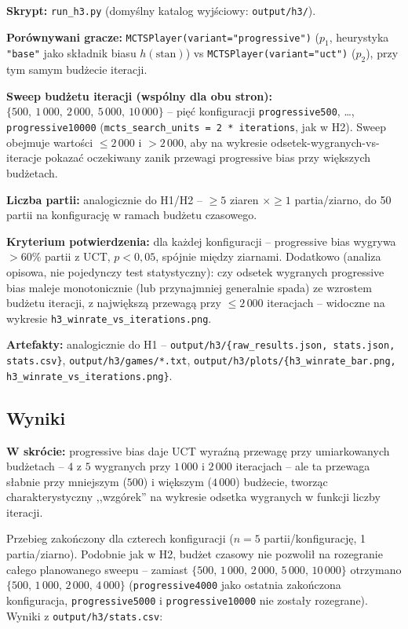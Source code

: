 \documentclass[11pt,a4paper]{article}
\begin{document}
\textbf{Skrypt:} \texttt{run\_h3.py} (domyślny katalog wyjściowy:
\texttt{output/h3/}).

\textbf{Porównywani gracze:} \texttt{MCTSPlayer(variant="progressive")}
($p_1$, heurystyka \texttt{"base"} jako składnik biasu $h(\text{stan})$)
vs \texttt{MCTSPlayer(variant="uct")} ($p_2$), przy tym samym budżecie
iteracji.

\textbf{Sweep budżetu iteracji (wspólny dla obu stron):}
$\{500,\ 1\,000,\ 2\,000,\ 5\,000,\ 10\,000\}$ -- pięć konfiguracji
\texttt{progressive500}, \dots, \texttt{progressive10000}
(\texttt{mcts\_search\_units = 2 * iterations}, jak w H2). Sweep
obejmuje wartości $\leq 2\,000$ i $> 2\,000$, aby na wykresie
odsetek-wygranych-vs-iteracje pokazać oczekiwany zanik przewagi
progressive bias przy większych budżetach.

\textbf{Liczba partii:} analogicznie do H1/H2 -- $\geq 5$ ziaren $\times
\geq 1$ partia/ziarno, do 50 partii na konfigurację w ramach budżetu
czasowego.

\textbf{Kryterium potwierdzenia:} dla każdej konfiguracji -- progressive
bias wygrywa $> 60\%$ partii z UCT, $p < 0{,}05$, spójnie między ziarnami.
Dodatkowo (analiza opisowa, nie pojedynczy test statystyczny): czy odsetek
wygranych progressive bias maleje monotonicznie (lub przynajmniej
generalnie spada) ze wzrostem budżetu iteracji, z największą przewagą przy
$\leq 2\,000$ iteracjach -- widoczne na wykresie
\texttt{h3\_winrate\_vs\_iterations.png}.

\textbf{Artefakty:} analogicznie do H1 --
\texttt{output/h3/\{raw\_results.json, stats.json, stats.csv\}},
\texttt{output/h3/games/*.txt},
\texttt{output/h3/plots/\{h3\_winrate\_bar.png,
h3\_winrate\_vs\_iterations.png\}}.

\subsection{Wyniki}

\textbf{W skrócie:} progressive bias daje UCT wyraźną przewagę przy
umiarkowanych budżetach -- $4$ z $5$ wygranych przy $1\,000$ i $2\,000$
iteracjach -- ale ta przewaga słabnie przy mniejszym ($500$) i większym
($4\,000$) budżecie, tworząc charakterystyczny ,,wzgórek'' na wykresie
odsetka wygranych w funkcji liczby iteracji.

Przebieg zakończony dla czterech konfiguracji
($n=5$ partii/konfigurację, 1 partia/ziarno). Podobnie jak w H2, budżet
czasowy nie pozwolił na rozegranie całego planowanego sweepu --
zamiast $\{500,\,1\,000,\,2\,000,\,5\,000,\,10\,000\}$ otrzymano
$\{500,\,1\,000,\,2\,000,\,4\,000\}$ (\texttt{progressive4000} jako
ostatnia zakończona konfiguracja, \texttt{progressive5000} i
\texttt{progressive10000} nie zostały rozegrane). Wyniki z
\texttt{output/h3/stats.csv}:
\end{document}
